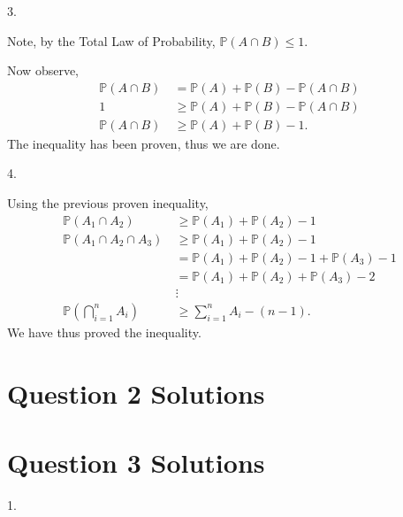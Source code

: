 \documentclass{article}
\begin{document}
3.

Note, by the Total Law of Probability, $\mathbb{P}(A\cap B) \leq 1$.

Now observe,
\begin{align*}
    \mathbb{P}(A\cap B) & = \mathbb{P}(A) +\mathbb{P}(B) - \mathbb{P}(A\cap B)\\    
    1 &\geq \mathbb{P}(A) +\mathbb{P}(B) - \mathbb{P}(A\cap B)\\
    \mathbb{P}(A\cap B)\ &\geq \mathbb{P}(A) +\mathbb{P}(B) - 1\mbox{.}
\end{align*}
\hspace*{6mm} The inequality has been proven, thus we are done.

4.

Using the previous proven inequality,
\begin{align*}
    \mathbb{P}(A_1\cap A_2)\ &\geq \mathbb{P}(A_1) + \mathbb{P}(A_2) - 1\\
    \mathbb{P}(A_1\cap A_2\cap A_3)\ &\geq \mathbb{P}(A_1) + \mathbb{P}(A_2) - 1\\
    &= \mathbb{P}(A_1) +\mathbb{P}(A_2) - 1 +  \mathbb{P}(A_3) - 1\\
    &= \mathbb{P}(A_1) +\mathbb{P}(A_2) +  \mathbb{P}(A_3) - 2\\
    &\vdots\\
    \mathbb{P}(\bigcap_{i = 1}^n A_i)\ &\geq \sum_{i = 1}^{n} A_i - (n-1)\mbox{.}
\end{align*}
\hspace*{6mm} We have thus proved the inequality. 

\section*{Question 2 Solutions} %


\section*{Question 3 Solutions} %
1.
\end{document}
